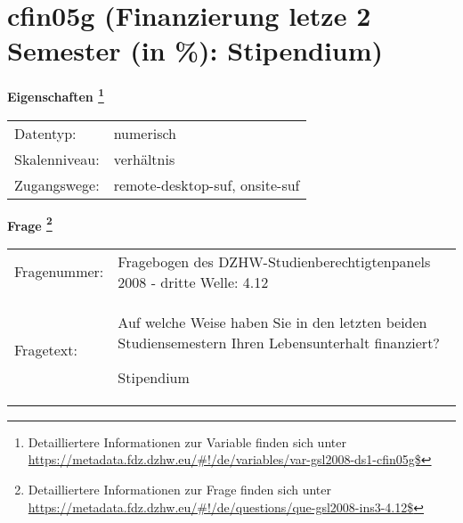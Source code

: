 
    \setcounter{footnote}{0}

    \vspace*{-1.8cm}
	\section{cfin05g (Finanzierung letze 2 Semester (in \%): Stipendium)}
	\label{section:cfin05g}



    \vspace*{0.5cm}
    \noindent\textbf{Eigenschaften
	\footnote{Detailliertere Informationen zur Variable finden sich unter
		\url{https://metadata.fdz.dzhw.eu/\#!/de/variables/var-gsl2008-ds1-cfin05g$}}}\\
	\begin{tabularx}{\hsize}{@{}lX}
	Datentyp: & numerisch \\
	Skalenniveau: & verhältnis \\
	Zugangswege: &
	  remote-desktop-suf, 
	  onsite-suf
 \\
    \end{tabularx}



				\vspace*{0.5cm}
                \noindent\textbf{Frage
	                \footnote{Detailliertere Informationen zur Frage finden sich unter
		              \url{https://metadata.fdz.dzhw.eu/\#!/de/questions/que-gsl2008-ins3-4.12$}}}\\
				\begin{tabularx}{\hsize}{@{}lX}
					Fragenummer: &
					  Fragebogen des DZHW-Studienberechtigtenpanels 2008 - dritte Welle:
					  4.12
 \\
					Fragetext: & Auf welche Weise haben Sie in den letzten beiden Studiensemestern Ihren Lebensunterhalt finanziert?\par  Stipendium \\
				\end{tabularx}






